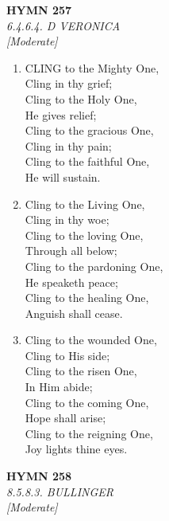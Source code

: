 \newpage
\begin{center}
    {\Large \textbf{HYMN 257}}
    \\
    \textit{6.4.6.4. D VERONICA}
    \\
    \textit{\small [Moderate]}
\end{center}
\vspace{1em}

\begin{enumerate}
    \item CLING to the Mighty One, \\
            Cling in thy grief; \\
        Cling to the Holy One, \\
            He gives relief; \\
        Cling to the gracious One, \\
            Cling in thy pain; \\
        Cling to the faithful One, \\
            He will sustain.

    \item Cling to the Living One, \\
            Cling in thy woe; \\
        Cling to the loving One, \\
            Through all below; \\
        Cling to the pardoning One, \\
            He speaketh peace; \\
        Cling to the healing One, \\
            Anguish shall cease.

    \item Cling to the wounded One, \\
            Cling to His side; \\
        Cling to the risen One, \\
            In Him abide; \\
        Cling to the coming One, \\
            Hope shall arise; \\
        Cling to the reigning One, \\
            Joy lights thine eyes.

\end{enumerate}

\newpage
\begin{center}
    {\Large \textbf{HYMN 258}}
    \\
    \textit{8.5.8.3. BULLINGER}
    \\
    \textit{\small [Moderate]}
\end{center}
\vspace{1em}

